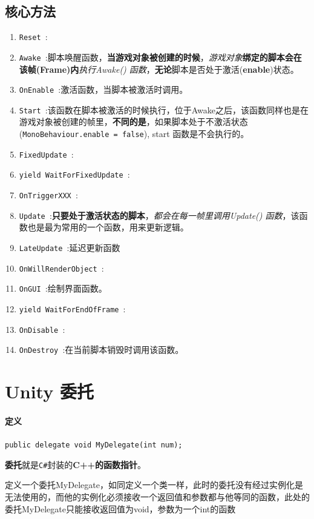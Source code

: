 \documentclass[UTF8,a4paper,12pt]{ctexbook}
\begin{document}
		\subsection{核心方法}
			\begin{enumerate}
				\item \verb|Reset |:
				\item \verb|Awake |:脚本唤醒函数，\textbf{当游戏对象被创建的时候}，\textit{游戏对象}\textbf{绑定的脚本会在该帧(Frame)内}\textit{执行Awake() 函数}，\textbf{无论}脚本是否处于激活(\textbf{enable})状态。
				\item \verb|OnEnable |:激活函数，当脚本被激活时调用。
				\item \verb|Start |:该函数在脚本被激活的时候执行，位于Awake之后，该函数同样也是在游戏对象被创建的帧里，\textbf{不同的是}，如果脚本处于不激活状态(\verb|MonoBehaviour.enable = false|), start 函数是不会执行的。
				\item \verb|FixedUpdate |:
				\item \verb|yield WaitForFixedUpdate |:
				\item \verb|OnTriggerXXX |:
				\item \verb|Update |:\textbf{只要处于激活状态的脚本}，\textit{都会在每一帧里调用Update() 函数}，该函数也是最为常用的一个函数，用来更新逻辑。
				\item \verb|LateUpdate |:延迟更新函数
				\item \verb|OnWillRenderObject |:
				\item \verb|OnGUI |:绘制界面函数。 
				\item \verb|yield WaitForEndOfFrame |:
				\item \verb|OnDisable |:
				\item \verb|OnDestroy |:在当前脚本销毁时调用该函数。
			\end{enumerate}
		
	\section{Unity 委托}
		
		\paragraph{定义}\verb|public delegate void MyDelegate(int num);|
		
			\textbf{委托}就是\verb|C#|封装的\textbf{C++的函数指针}。
			
			定义一个委托MyDelegate，如同定义一个类一样，此时的委托没有经过实例化是无法使用的，而他的实例化必须接收一个返回值和参数都与他等同的函数，此处的委托MyDelegate只能接收返回值为void，参数为一个int的函数
			
\end{document}
